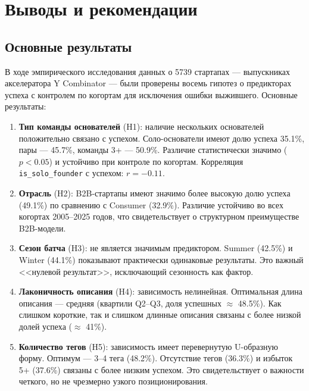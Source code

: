 \newpage

\section{Выводы и рекомендации}

\subsection{Основные результаты}

В ходе эмпирического исследования данных о 5739 стартапах --- выпускниках акселератора Y Combinator --- были проверены восемь гипотез о предикторах успеха с контролем по когортам для исключения ошибки выжившего. Основные результаты:

\begin{enumerate}
    \item \textbf{Тип команды основателей} (H1): наличие нескольких основателей положительно связано с успехом. Соло-основатели имеют долю успеха 35.1\%, пары --- 45.7\%, команды 3+ --- 50.9\%. Различие статистически значимо ($p < 0.05$) и устойчиво при контроле по когортам. Корреляция \texttt{is\_solo\_founder} с успехом: $r = -0.11$.

    \item \textbf{Отрасль} (H2): B2B-стартапы имеют значимо более высокую долю успеха (49.1\%) по сравнению с Consumer (32.9\%). Различие устойчиво во всех когортах 2005--2025 годов, что свидетельствует о структурном преимуществе B2B-модели.

    \item \textbf{Сезон батча} (H3): не является значимым предиктором. Summer (42.5\%) и Winter (44.1\%) показывают практически одинаковые результаты. Это важный <<нулевой результат>>, исключающий сезонность как фактор.

    \item \textbf{Лаконичность описания} (H4): зависимость нелинейная. Оптимальная длина описания --- средняя (квартили Q2--Q3, доля успешных $\approx$ 48.5\%). Как слишком короткие, так и слишком длинные описания связаны с более низкой долей успеха ($\approx$ 41\%).

    \item \textbf{Количество тегов} (H5): зависимость имеет перевернутую U-образную форму. Оптимум --- 3--4 тега (48.2\%). Отсутствие тегов (36.3\%) и избыток 5+ (37.6\%) связаны с более низким успехом. Это свидетельствует о важности четкого, но не чрезмерно узкого позиционирования.


\end{enumerate}
